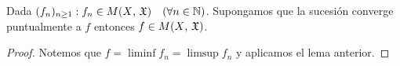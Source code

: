 \begin{corollary}
    Dada \((f_n)_{n \geq 1} : f_n \in M(X\text{, } \mathfrak{X}) \quad (\forall n \in \mathbb{N})\). Supongamos que la sucesión converge puntualmente a \(f\) entonces \(f \in M(X\text{, } \mathfrak{X})\).
    \begin{proof}
        Notemos que \(f = \liminf f_n = \limsup f_n\) y aplicamos el lema anterior.
    \end{proof}
\end{corollary}